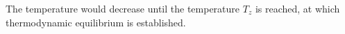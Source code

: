 The temperature would decrease until the temperature \( T_z \) is reached, at which thermodynamic equilibrium is established.